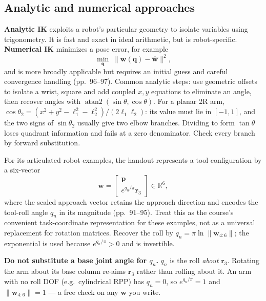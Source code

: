 \documentclass[11pt,a4paper]{article}
\newcommand{\R}{\mathbb{R}}
\begin{document}
\subsection{Analytic and numerical approaches}

\textbf{Analytic IK} exploits a robot's particular geometry to isolate variables using trigonometry. It is fast and exact in ideal arithmetic, but is robot-specific. \textbf{Numerical IK} minimizes a pose error, for example
\[
  \min_{\mathbf q}\;\lVert\mathbf w(\mathbf q)-\widehat{\mathbf w}\rVert^2,
\]
and is more broadly applicable but requires an initial guess and careful convergence handling (pp.~96--97).
Common analytic steps: use geometric offsets to isolate a wrist, square and add
coupled $x,y$ equations to eliminate an angle, then recover angles with
$\operatorname{atan2}(\sin\theta,\cos\theta)$. For a planar 2R arm,
$\cos\theta_2=(x^2+y^2-\ell_1^2-\ell_2^2)/(2\ell_1\ell_2)$:
its value must lie in $[-1,1]$, and the two signs of $\sin\theta_2$
usually give two elbow branches. Dividing to form $\tan\theta$ loses quadrant
information and fails at a zero denominator. Check every branch by forward substitution.

For its articulated-robot examples, the handout represents a tool configuration by a six-vector
\[
  \mathbf w=\begin{bmatrix}\mathbf p\\e^{q_n/\pi}\mathbf r_3\end{bmatrix}\in\R^6,
\]
where the scaled approach vector retains the approach direction and encodes the tool-roll angle $q_n$ in its magnitude (pp.~91--95). Treat this as the course's convenient task-coordinate representation for these examples, not as a universal replacement for rotation matrices. Recover the roll by $q_n=\pi\ln\lVert\mathbf w_{4:6}\rVert$; the exponential is used because $e^{q_n/\pi}>0$ and is invertible.

\textbf{Do not substitute a base joint angle for $q_n$.} $q_n$ is the roll \emph{about} $\mathbf r_3$. Rotating the arm about its base column re-aims $\mathbf r_3$ rather than rolling about it. An arm with no roll DOF (e.g.\ cylindrical RPP) has $q_n=0$, so $e^{q_n/\pi}=1$ and $\lVert\mathbf w_{4:6}\rVert=1$ --- a free check on any $\mathbf w$ you write.
\end{document}
